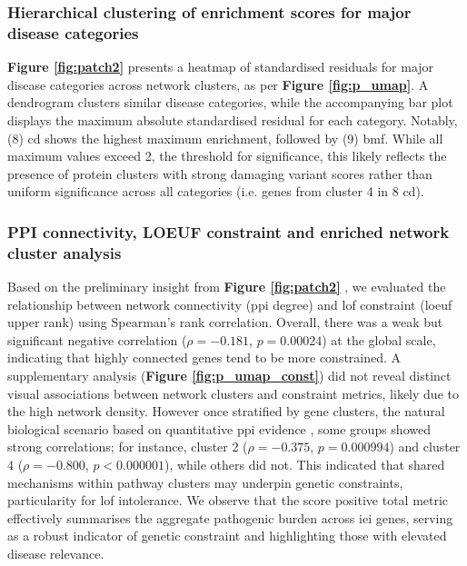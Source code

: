 \FloatBarrier
\subsubsection{Hierarchical clustering of enrichment scores for major disease categories}
\textbf{Figure \ref{fig:patch2}} presents a heatmap of standardised residuals for major disease categories across network clusters, as per \textbf{Figure \ref{fig:p_umap}}. 
A dendrogram clusters similar disease categories, while the accompanying bar plot displays the maximum absolute standardised residual for each category.
Notably, (8) \ac{cd} shows the highest maximum enrichment, followed by 
(9) \ac{bmf}. 
While all maximum values exceed 2, the threshold for significance, this likely reflects the presence of protein clusters with strong damaging variant scores rather than uniform significance across all categories (i.e. genes from cluster 4 in 8 \ac{cd}).


\subsubsection{PPI connectivity, LOEUF constraint and enriched network cluster analysis}

Based on the preliminary insight from \textbf{Figure \ref{fig:patch2}} ,
we evaluated the relationship between network connectivity (\ac{ppi} degree) and \ac{lof} constraint (\ac{loeuf} upper rank) \citet{karczewski2020mutational} using Spearman’s rank correlation.
Overall, there was a weak but significant negative correlation ($\rho = -0.181$, $p = 0.00024$) at the global scale, indicating that highly connected genes tend to be more constrained. 
A supplementary analysis (\textbf{Figure \ref{fig:p_umap_const}})
did not reveal distinct visual associations between network clusters and constraint metrics, likely due to the high network density. 
However once stratified by gene clusters, the natural biological scenario based on quantitative \ac{ppi} evidence \cite{szklarczyk2025string},
some groups showed strong correlations; for instance, cluster 2 ($\rho = -0.375$, $p = 0.000994$) and cluster 4 ($\rho = -0.800$, $p < 0.000001$), while others did not.
This indicated that shared mechanisms within pathway clusters may underpin genetic constraints, particularity for \ac{lof} intolerance. We observe that the score positive total metric effectively summarises the aggregate pathogenic burden across \ac{iei} genes, serving as a robust indicator of genetic constraint and highlighting those with elevated disease relevance.

